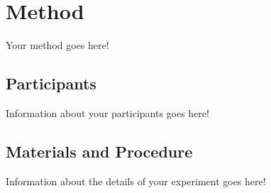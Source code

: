 \section{Method}

Your method goes here!
\subsection{Participants}
Information about your participants goes here!
\subsection{Materials and Procedure}
Information about the details of your experiment goes here!
